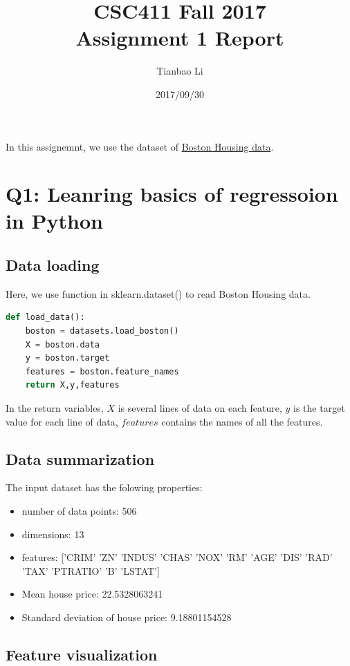 \documentclass[a4paper]{article}
\title{CSC411 Fall 2017\\Assignment 1 Report}
\author{Tianbao Li}
\date{2017/09/30}
\begin{document}
\maketitle

In this assignemnt, we use the dataset of \href{http://lib.stat.cmu.edu/datasets/boston}{Boston Housing data}.

\section{Q1: Leanring basics of regressoion in Python}

\subsection{Data loading}

Here, we use function in sklearn.dataset() to read Boston Housing data.

\begin{lstlisting}[language = Python]
def load_data():
    boston = datasets.load_boston()
    X = boston.data
    y = boston.target
    features = boston.feature_names
    return X,y,features
\end{lstlisting}

In the return variables, $X$ is several lines of data on each feature, $y$ is the target value for each line of data, $features$ contains the names of all the features.

\subsection{Data summarization}

The input dataset has the folowing properties:

\begin{itemize}
	\item number of data points: 506
	\item dimensions: 13
	\item features: ['CRIM' 'ZN' 'INDUS' 'CHAS' 'NOX' 'RM' 'AGE' 'DIS' 'RAD' 'TAX' 'PTRATIO' 'B' 'LSTAT']
    \item Mean house price: 22.5328063241
    \item Standard deviation of house price: 9.18801154528
\end{itemize}

\subsection{Feature visualization}
\end{document}
